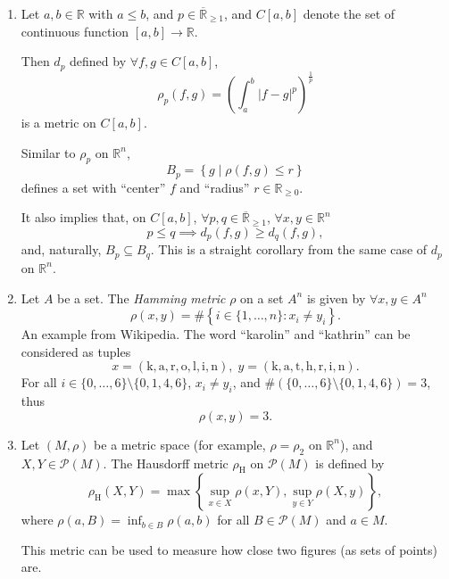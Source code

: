 \begin{example}
\begin{enumerate}
		
		\item Let $a,b \in \mathbb R$ with $a \le b$, and $p \in \overline{\mathbb R}_{\ge 1}$, and $C[a,b]$ denote the set of continuous function $[a,b] \to \mathbb R$.
		
			Then $d_p$ defined by $\forall f, g \in C[a,b]$,
			$$
			\rho_{p}(f,g) = \left( \int_a^b |f - g|^{p} \right)^\frac{1}{p}
			$$
			is a metric on $C[a,b]$.
			
			
			Similar to $\rho_p$ on $\mathbb R^n$,
			$$
			B_{p} = \left\{ g \;|\; \rho(f, g) \le r \right\}
			$$
			defines a set with ``center'' $f$ and ``radius'' $r \in \mathbb R_{\ge 0}$.
			
			It also implies that, on $C[a,b]$, $\forall p, q \in \overline{\mathbb R}_{\ge 1}$, $\forall x,y \in \mathbb R^n$
			$$
			p \le q \implies d_p(f,g) \ge d_q(f,g),
			$$
			and, naturally, $B_p \subseteq B_q$. This is a straight corollary from the same case of $d_p$ on $\mathbb R^n$.
		
		
		\item Let $A$ be a set. The \textit{Hamming metric} $\rho$ on a set $A^n$ is given by $\forall x,y \in A^n$
			$$
			\rho(x,y) = \# \left\{ i \in \{1, \ldots, n\} : x_i \ne y_i \right\}.
			$$
			An example from Wikipedia. The word ``karolin'' and ``kathrin'' can be considered as tuples
			$$
			x = ( \mathrm{ k, a, r, o, l, i, n } ), \; y = ( \mathrm{k, a, t, h, r, i, n} ).
			$$
			For all $i \in \{0, \ldots, 6\} \setminus \{ 0, 1, 4, 6 \}$, $x_i \ne y_i$, and $\# (\{0, \ldots, 6\} \setminus \{ 0, 1, 4, 6 \}) = 3$, thus
			$$
			\rho(x,y) = 3.
			$$
		
		
		\item Let $(M, \rho)$ be a metric space (for example, $\rho = \rho_2$ on $\mathbb R^n$), and $X, Y \in \mathcal P(M)$. The Hausdorff metric $\rho_\mathrm{H}$ on $\mathcal P(M)$ is defined by
			$$
			\rho_\mathrm{H}(X,Y) = \max \left\{ \sup_{x \in X} \rho(x,Y), \sup_{y \in Y} \rho(X,y) \right\},
			$$
			where $\rho(a, B) = \inf_{b \in B} \rho(a,b)$ for all $B \in \mathcal P(M)$ and $a \in M$.
			
			This metric can be used to measure how close two figures (as sets of points) are.
	\end{enumerate}
\end{example}


